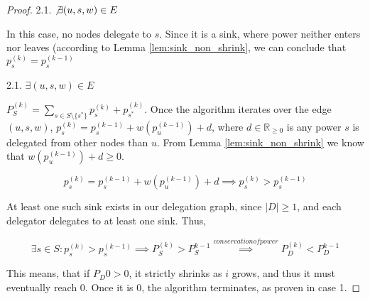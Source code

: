 \begin{proof}
2.1. $\not\exists (u, s, w) \in E$

In this case, no nodes delegate to $s$. Since it is a sink, where power neither enters nor leaves (according to Lemma \ref{lem:sink_non_shrink}, we can conclude that $p_s^{(k)} = p_s^{(k-1)}$

2.1. $\exists (u, s, w) \in E$

$P_S^{(k)} = \sum_{s \in S \setminus \{s^*\}} p_s^{(k)} + p_{s^*}^{(k)}$. Once the algorithm iterates over the edge $(u, s, w)$, $p_s^{(k)} = p_s^{(k-1)} + w(p_u^{(k-1)}) + d$, where $d \in \mathbb{R}_{\ge 0}$ is any power $s$ is delegated from other nodes than $u$. From Lemma \ref{lem:sink_non_shrink} we know that $ w(p_u^{(k-1)}) + d \ge 0$. 

\[p_s^{(k)} = p_s^{(k-1)} + w(p_u^{(k-1)}) + d \implies p_s^{(k)}  > p_s^{(k-1)} \]

At least one such sink exists in our delegation graph, since $|D| \ge 1$, and each delegator delegates to at least one sink.  Thus, 

\[
\exists s \in S: p_s^{(k)}  > p_s^{(k-1)} \implies P_S^{(k)} > P_S^{k-1} \overset{conservation of power}{\implies}  P_D^{(k)} < P_D^{k-1}
\]

This means, that if $P_D{0} > 0$, it strictly shrinks as $i$ grows, and thus it must eventually reach 0. Once it is 0, the algorithm terminates, as proven in case 1.

\end{proof}
